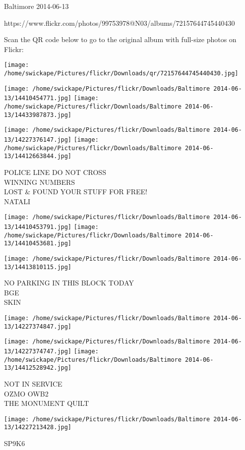 \documentclass[10pt,letterpaper]{article}
\begin{document}
Baltimore 2014-06-13

https://www.flickr.com/photos/99753978@N03/albums/72157644745440430

Scan the QR code below to go to the original album with full-size photos on Flickr:

\texttt{[image: /home/swickape/Pictures/flickr/Downloads/qr/72157644745440430.jpg]}
\pagebreak

\texttt{[image: /home/swickape/Pictures/flickr/Downloads/Baltimore 2014-06-13/14410454771.jpg]}
\texttt{[image: /home/swickape/Pictures/flickr/Downloads/Baltimore 2014-06-13/14433987873.jpg]}

\texttt{[image: /home/swickape/Pictures/flickr/Downloads/Baltimore 2014-06-13/14227376147.jpg]}
\texttt{[image: /home/swickape/Pictures/flickr/Downloads/Baltimore 2014-06-13/14412663844.jpg]}

POLICE LINE DO NOT CROSS\\
WINNING NUMBERS\\
LOST \& FOUND YOUR STUFF FOR FREE!\\
NATALI
\pagebreak

\texttt{[image: /home/swickape/Pictures/flickr/Downloads/Baltimore 2014-06-13/14410453791.jpg]}
\texttt{[image: /home/swickape/Pictures/flickr/Downloads/Baltimore 2014-06-13/14410453681.jpg]}

\texttt{[image: /home/swickape/Pictures/flickr/Downloads/Baltimore 2014-06-13/14413810115.jpg]}

NO PARKING IN THIS BLOCK TODAY\\
BGE\\
SKIN
\pagebreak

\texttt{[image: /home/swickape/Pictures/flickr/Downloads/Baltimore 2014-06-13/14227374847.jpg]}

\vspace{0.25in}
\texttt{[image: /home/swickape/Pictures/flickr/Downloads/Baltimore 2014-06-13/14227374747.jpg]}
\texttt{[image: /home/swickape/Pictures/flickr/Downloads/Baltimore 2014-06-13/14412528942.jpg]}

NOT IN SERVICE\\
OZMO OWB2\\
THE MONUMENT QUILT
\pagebreak

\texttt{[image: /home/swickape/Pictures/flickr/Downloads/Baltimore 2014-06-13/14227213428.jpg]}

SP9K6
\pagebreak
\end{document}
